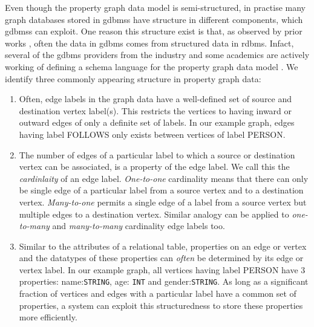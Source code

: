 \begin{guideline}
\label{gdln:graph-schema}
Even though the property graph data model is semi-structured, in practise many graph databases stored in \gls{gdbms}s have structure in different components, which \gls{gdbms}s can exploit. One reason this structure exist is that, as observed by prior works \cite{survey}, often the data in \gls{gdbms} comes from structured data in \gls{rdbms}. Infact, several of the \gls{gdbms} providers from the industry and some academics are actively working of defining a schema language for the property graph data model \cite{schema-validation-bonifati, defining-schema-hartig}. We identify three commonly appearing structure in property graph data:


\begin{enumerate}
	
	\item Often, edge labels in the graph data have a well-defined set of source and destination vertex label(s). This restricts the vertices to  having inward or outward edges of only a definite set of labels. In our example graph, edges having label FOLLOWS only exists between vertices of label PERSON.
	
	\item The number of edges of a particular label to which a source or destination vertex can be associated, is a property of the edge label. We call this the \emph{cardinlaity} of an edge label. \emph{One-to-one} cardinality means that there can only be single edge of a particular label from a source vertex and to a destination vertex. \emph{Many-to-one} permits a single edge of a label from a source vertex but multiple edges to a destination vertex. Similar analogy can be applied to \emph{one-to-many} and \emph{many-to-many} cardinality edge labels too.
	
	\item Similar to the attributes of a relational table, properties on an edge or vertex and the datatypes of these properties can \emph{often} be determined by its edge or vertex label. In our example graph, all vertices having label PERSON have 3 properties: name:\texttt{STRING}, age: \texttt{INT} and gender:\texttt{STRING}. As long as a significant fraction of vertices and edges with a particular label have a common set of properties, a system can exploit this structuredness to store these properties more efficiently. 
	
\end{enumerate}



\end{guideline}
